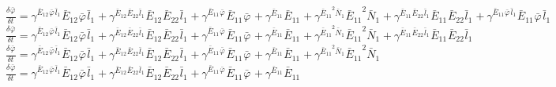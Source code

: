 $\frac{{\delta}^{} {\bar{\varphi}}_{}}{{\delta} {{{t}}_{}}^{}} = {\gamma}^{{{{\bar{E}}_{12}}^{}{{\bar{\varphi}}_{}}^{}{{\bar{l}}_{1}}^{}}}{{{\bar{E}}_{12}}^{}{{\bar{\varphi}}_{}}^{}{{\bar{l}}_{1}}^{}} + {\gamma}^{{{{\bar{E}}_{12}}^{}{{\bar{E}}_{22}}^{}{{\bar{l}}_{1}}^{}}}{{{\bar{E}}_{12}}^{}{{\bar{E}}_{22}}^{}{{\bar{l}}_{1}}^{}} + {\gamma}^{{{{\bar{E}}_{11}}^{}{{\bar{\varphi}}_{}}^{}}}{{{\bar{E}}_{11}}^{}{{\bar{\varphi}}_{}}^{}} + {\gamma}^{{{{\bar{E}}_{11}}^{}}}{{{\bar{E}}_{11}}^{}} + {\gamma}^{{{{\bar{E}}_{11}}^{2}{{\bar{N}}_{1}}^{}}}{{{\bar{E}}_{11}}^{2}{{\bar{N}}_{1}}^{}} + {\gamma}^{{{{\bar{E}}_{11}}^{}{{\bar{E}}_{22}}^{}{{\bar{l}}_{1}}^{}}}{{{\bar{E}}_{11}}^{}{{\bar{E}}_{22}}^{}{{\bar{l}}_{1}}^{}} + {\gamma}^{{{{\bar{E}}_{11}}^{}{{\bar{\varphi}}_{}}^{}{{\bar{l}}_{1}}^{}}}{{{\bar{E}}_{11}}^{}{{\bar{\varphi}}_{}}^{}{{\bar{l}}_{1}}^{}}$
$\frac{{\delta}^{} {\bar{\varphi}}_{}}{{\delta} {{{t}}_{}}^{}} = {\gamma}^{{{{\bar{E}}_{12}}^{}{{\bar{\varphi}}_{}}^{}{{\bar{l}}_{1}}^{}}}{{{\bar{E}}_{12}}^{}{{\bar{\varphi}}_{}}^{}{{\bar{l}}_{1}}^{}} + {\gamma}^{{{{\bar{E}}_{12}}^{}{{\bar{E}}_{22}}^{}{{\bar{l}}_{1}}^{}}}{{{\bar{E}}_{12}}^{}{{\bar{E}}_{22}}^{}{{\bar{l}}_{1}}^{}} + {\gamma}^{{{{\bar{E}}_{11}}^{}{{\bar{\varphi}}_{}}^{}}}{{{\bar{E}}_{11}}^{}{{\bar{\varphi}}_{}}^{}} + {\gamma}^{{{{\bar{E}}_{11}}^{}}}{{{\bar{E}}_{11}}^{}} + {\gamma}^{{{{\bar{E}}_{11}}^{2}{{\bar{N}}_{1}}^{}}}{{{\bar{E}}_{11}}^{2}{{\bar{N}}_{1}}^{}} + {\gamma}^{{{{\bar{E}}_{11}}^{}{{\bar{E}}_{22}}^{}{{\bar{l}}_{1}}^{}}}{{{\bar{E}}_{11}}^{}{{\bar{E}}_{22}}^{}{{\bar{l}}_{1}}^{}}$
$\frac{{\delta}^{} {\bar{\varphi}}_{}}{{\delta} {{{t}}_{}}^{}} = {\gamma}^{{{{\bar{E}}_{12}}^{}{{\bar{\varphi}}_{}}^{}{{\bar{l}}_{1}}^{}}}{{{\bar{E}}_{12}}^{}{{\bar{\varphi}}_{}}^{}{{\bar{l}}_{1}}^{}} + {\gamma}^{{{{\bar{E}}_{12}}^{}{{\bar{E}}_{22}}^{}{{\bar{l}}_{1}}^{}}}{{{\bar{E}}_{12}}^{}{{\bar{E}}_{22}}^{}{{\bar{l}}_{1}}^{}} + {\gamma}^{{{{\bar{E}}_{11}}^{}{{\bar{\varphi}}_{}}^{}}}{{{\bar{E}}_{11}}^{}{{\bar{\varphi}}_{}}^{}} + {\gamma}^{{{{\bar{E}}_{11}}^{}}}{{{\bar{E}}_{11}}^{}} + {\gamma}^{{{{\bar{E}}_{11}}^{2}{{\bar{N}}_{1}}^{}}}{{{\bar{E}}_{11}}^{2}{{\bar{N}}_{1}}^{}}$
$\frac{{\delta}^{} {\bar{\varphi}}_{}}{{\delta} {{{t}}_{}}^{}} = {\gamma}^{{{{\bar{E}}_{12}}^{}{{\bar{\varphi}}_{}}^{}{{\bar{l}}_{1}}^{}}}{{{\bar{E}}_{12}}^{}{{\bar{\varphi}}_{}}^{}{{\bar{l}}_{1}}^{}} + {\gamma}^{{{{\bar{E}}_{12}}^{}{{\bar{E}}_{22}}^{}{{\bar{l}}_{1}}^{}}}{{{\bar{E}}_{12}}^{}{{\bar{E}}_{22}}^{}{{\bar{l}}_{1}}^{}} + {\gamma}^{{{{\bar{E}}_{11}}^{}{{\bar{\varphi}}_{}}^{}}}{{{\bar{E}}_{11}}^{}{{\bar{\varphi}}_{}}^{}} + {\gamma}^{{{{\bar{E}}_{11}}^{}}}{{{\bar{E}}_{11}}^{}}$
